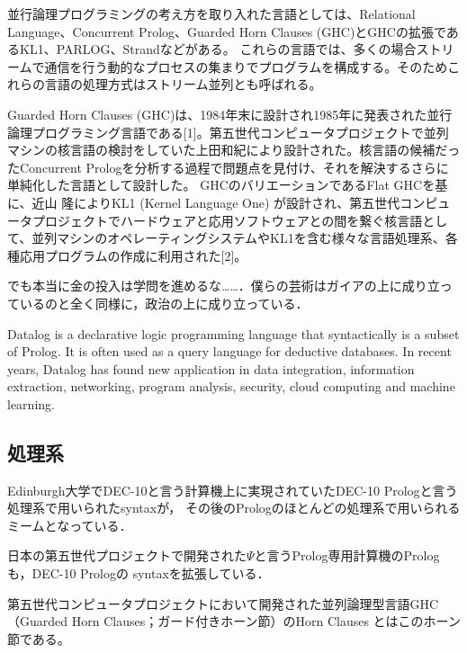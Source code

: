 \documentclass[uplatex, dvipdfmx]{jsreport}
\begin{document}
\begin{application}
    並行論理プログラミングの考え方を取り入れた言語としては、Relational Language、Concurrent Prolog、Guarded Horn Clauses (GHC)とGHCの拡張であるKL1、PARLOG、Strandなどがある。 これらの言語では、多くの場合ストリームで通信を行う動的なプロセスの集まりでプログラムを構成する。そのためこれらの言語の処理方式はストリーム並列とも呼ばれる。

    Guarded Horn Clauses (GHC)は、1984年末に設計され1985年に発表された並行論理プログラミング言語である[1]。第五世代コンピュータプロジェクトで並列マシンの核言語の検討をしていた上田和紀により設計された。核言語の候補だったConcurrent Prologを分析する過程で問題点を見付け、それを解決するさらに単純化した言語として設計した。
    GHCのバリエーションであるFlat GHCを基に、近山 隆によりKL1 (Kernel Language One) が設計され、第五世代コンピュータプロジェクトでハードウェアと応用ソフトウェアとの間を繋ぐ核言語として、並列マシンのオペレーティングシステムやKL1を含む様々な言語処理系、各種応用プログラムの作成に利用された[2]。
\end{application}
でも本当に金の投入は学問を進めるな……．僕らの芸術はガイアの上に成り立っているのと全く同様に，政治の上に成り立っている．

\begin{application}[Datalog]
    Datalog is a declarative logic programming language that syntactically is a subset of Prolog. It is often used as a query language for deductive databases. In recent years, Datalog has found new application in data integration, information extraction, networking, program analysis, security, cloud computing and machine learning.
\end{application}

\subsection{処理系}

\begin{history}[DEC-10]
Edinburgh大学でDEC-10と言う計算機上に実現されていたDEC-10 Prologと言う処理系で用いられたsyntaxが，
その後のPrologのほとんどの処理系で用いられるミームとなっている．
\end{history}

\begin{example}[$\Psi$]
    日本の第五世代プロジェクトで開発された$\Psi$と言うProlog専用計算機のPrologも，DEC-10 Prologの
    syntaxを拡張している．
\end{example}
\begin{remark}
    第五世代コンピュータプロジェクトにおいて開発された並列論理型言語GHC（Guarded Horn Clauses；ガード付きホーン節）のHorn Clauses とはこのホーン節である。
\end{remark}
\end{document}
